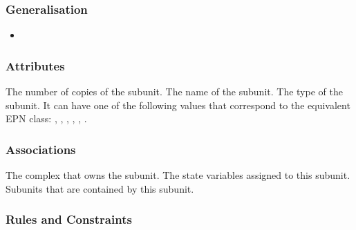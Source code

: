 \subsubsection{Generalisation}

\begin{itemize}
\item {}
\end{itemize}

\subsubsection{Attributes}

\begin{attributes}
   The number of copies of the subunit.
   The name of the subunit.
   The type of the subunit. It can have
  one of the following values that correspond to the equivalent EPN
  class: , ,
  , ,
  , .
\end{attributes}

\subsubsection{Associations}

\begin{attributes}
   The complex that owns the subunit.
   The state variables assigned
  to this subunit.
   Subunits that are contained by this subunit.
\end{attributes}

\subsubsection{Rules and Constraints}

